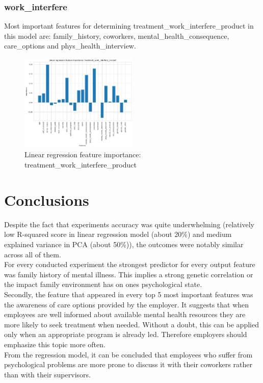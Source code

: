 \documentclass[conference]{IEEEtran}
\begin{document}
\subsubsection{\textbf{work\_interfere}}
Most important features for determining treatment\_work\_interfere\_product in this model are: family\_history, coworkers, mental\_health\_consequence, care\_options and phys\_health\_interview.
\begin{figure}[H]
    \includegraphics[width=0.5\textwidth]{lin-reg-product.png}
    \centering
    \caption{Linear regression feature importance: treatment\_work\_interfere\_product}
\end{figure}

\section{Conclusions}
Despite the fact that experiments accuracy was quite underwhelming (relatively low R-squared score in linear regression model (about 20\%) and medium  explained variance in PCA (about 50\%)), the outcomes were notably similar across all of them.\\

For every conducted experiment the strongest predictor for every output feature was family history of mental illness. This implies a strong genetic correlation or the impact family environment has on ones psychological state.\\

Secondly, the feature that appeared in every top 5 most important features was the awareness of care options provided by the employer. It suggests that when employees are well informed about available mental health resources they are more likely to seek treatment when needed. Without a doubt, this can be applied only when an appropriate program is already led. Therefore employers should emphasize this topic more often. \\

From the regression model, it can be concluded that employees who suffer from psychological problems are more prone to discuss it with their coworkers rather than with their supervisors.\\
\end{document}
